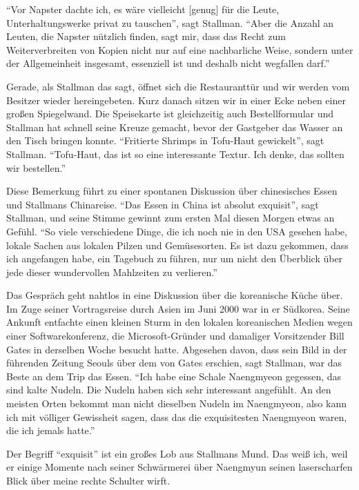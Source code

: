 "`Vor Napster dachte ich, es wäre vielleicht [genug] für die Leute, Unterhaltungswerke privat zu tauschen"', sagt Stallman. "`Aber die Anzahl an Leuten, die Napster nützlich finden, sagt mir, dass das Recht zum Weiterverbreiten von Kopien nicht nur auf eine nachbarliche Weise, sondern unter der Allgemeinheit insgesamt, essenziell ist und deshalb nicht wegfallen darf."'

Gerade, als Stallman das sagt, öffnet sich die Restauranttür und wir werden vom Besitzer wieder hereingebeten. Kurz danach sitzen wir in einer Ecke neben einer großen Spiegelwand.
Die Speisekarte ist gleichzeitig auch Bestellformular und Stallman hat schnell seine Kreuze gemacht, bevor der Gastgeber das Wasser an den Tisch bringen konnte. "`Fritierte Shrimps in Tofu-Haut gewickelt"', sagt Stallman. "`Tofu-Haut, das ist so eine interessante Textur. Ich denke, das sollten wir bestellen."'

Diese Bemerkung führt zu einer spontanen Diskussion über chinesisches Essen und Stallmans Chinareise. "`Das Essen in China ist absolut exquisit"', sagt Stallman, und seine Stimme gewinnt zum ersten Mal diesen Morgen etwas an Gefühl. "`So viele verschiedene Dinge, die ich noch nie in den USA gesehen habe, lokale Sachen aus lokalen Pilzen und Gemüsesorten. Es ist dazu gekommen, dass ich angefangen habe, ein Tagebuch zu führen, nur um nicht den Überblick über jede dieser wundervollen Mahlzeiten zu verlieren."'

Das Gespräch geht nahtlos in eine Diskussion über die koreanische Küche über. Im Zuge seiner Vortragsreise durch Asien im Juni 2000 war in er Südkorea. Seine Ankunft entfachte einen kleinen Sturm in den lokalen koreanischen Medien wegen einer Softwarekonferenz, die Microsoft-Gründer und damaliger Vorsitzender Bill Gates in derselben Woche besucht hatte. Abgesehen davon, dass sein Bild in der führenden Zeitung Seouls über dem von Gates erschien, sagt Stallman, war das Beste an dem Trip das Essen. "`Ich habe eine Schale Naengmyeon gegessen, das sind kalte Nudeln. Die Nudeln haben sich sehr interessant angefühlt. An den meisten Orten bekommt man nicht dieselben Nudeln im Naengmyeon, also kann ich mit völliger Gewissheit sagen, dass das die exquisitesten Naengmyeon waren, die ich jemals hatte."'

Der Begriff "`exquisit"' ist ein großes Lob aus Stallmans Mund. Das weiß ich, weil er einige Momente nach seiner Schwärmerei über Naengmyun seinen laserscharfen Blick über meine rechte Schulter wirft.

